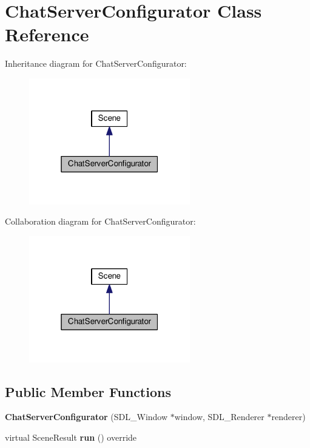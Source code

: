 \hypertarget{classChatServerConfigurator}{}\section{Chat\+Server\+Configurator Class Reference}
\label{classChatServerConfigurator}


Inheritance diagram for Chat\+Server\+Configurator\+:\nopagebreak
\begin{figure}[H]
\begin{center}
\leavevmode
\includegraphics[width=199pt]{classChatServerConfigurator__inherit__graph}
\end{center}
\end{figure}


Collaboration diagram for Chat\+Server\+Configurator\+:\nopagebreak
\begin{figure}[H]
\begin{center}
\leavevmode
\includegraphics[width=199pt]{classChatServerConfigurator__coll__graph}
\end{center}
\end{figure}
\subsection*{Public Member Functions}
\begin{DoxyCompactItemize}
\item 
{\bfseries Chat\+Server\+Configurator} (S\+D\+L\+\_\+\+Window $\ast$window, S\+D\+L\+\_\+\+Renderer $\ast$renderer)\hypertarget{classChatServerConfigurator_ae05ba01a4fd49b308f38f251a7e2e7d2}{}\label{classChatServerConfigurator_ae05ba01a4fd49b308f38f251a7e2e7d2}

\item 
virtual Scene\+Result {\bfseries run} () override\hypertarget{classChatServerConfigurator_aafcf0a3b741afcde01c174aec1d3112a}{}\label{classChatServerConfigurator_aafcf0a3b741afcde01c174aec1d3112a}

\end{DoxyCompactItemize}
